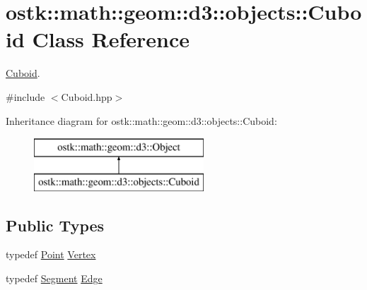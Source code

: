 \hypertarget{classostk_1_1math_1_1geom_1_1d3_1_1objects_1_1_cuboid}{}\section{ostk\+:\+:math\+:\+:geom\+:\+:d3\+:\+:objects\+:\+:Cuboid Class Reference}
\label{classostk_1_1math_1_1geom_1_1d3_1_1objects_1_1_cuboid}


\hyperlink{classostk_1_1math_1_1geom_1_1d3_1_1objects_1_1_cuboid}{Cuboid}.  




{\ttfamily \#include $<$Cuboid.\+hpp$>$}

Inheritance diagram for ostk\+:\+:math\+:\+:geom\+:\+:d3\+:\+:objects\+:\+:Cuboid\+:\begin{figure}[H]
\begin{center}
\leavevmode
\includegraphics[height=2.000000cm]{classostk_1_1math_1_1geom_1_1d3_1_1objects_1_1_cuboid}
\end{center}
\end{figure}
\subsection*{Public Types}
\begin{DoxyCompactItemize}
\item 
typedef \hyperlink{classostk_1_1math_1_1geom_1_1d3_1_1objects_1_1_point}{Point} \hyperlink{classostk_1_1math_1_1geom_1_1d3_1_1objects_1_1_cuboid_a0d3440e0c30348ece10f3658130e9b55}{Vertex}
\item 
typedef \hyperlink{classostk_1_1math_1_1geom_1_1d3_1_1objects_1_1_segment}{Segment} \hyperlink{classostk_1_1math_1_1geom_1_1d3_1_1objects_1_1_cuboid_af9482cb1219e7d447aaf76b6e2dbb1d1}{Edge}
\end{DoxyCompactItemize}
